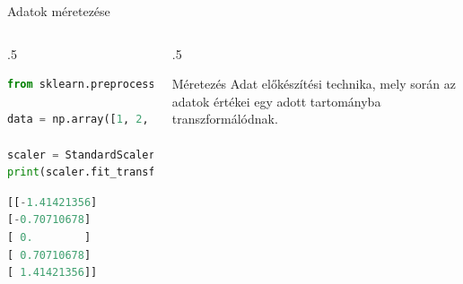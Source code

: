 \documentclass[english, aspectratio=169]{beamer}
\begin{document}
	\begin{frame}[fragile]{Adatok méretezése}
		\begin{columns}
			\begin{column}{.5\textwidth}
				\begin{lstlisting}[language=python]
from sklearn.preprocessing import StandardScaler

data = np.array([1, 2, 3, 4, 5]).reshape(-1, 1)

scaler = StandardScaler()
print(scaler.fit_transform(data))
				\end{lstlisting}
				\begin{lstlisting}[language=python]
[[-1.41421356]
[-0.70710678]
[ 0.        ]
[ 0.70710678]
[ 1.41421356]]
				\end{lstlisting}            
			\end{column}
			\begin{column}{.5\textwidth}
				\begin{block}{Méretezés}
					Adat előkészítési technika, mely során az adatok értékei egy adott tartományba transzformálódnak.
				\end{block}
				\begin{center}
				\end{center}
			\end{column}
		\end{columns}
	\end{frame}
	
\end{document}
